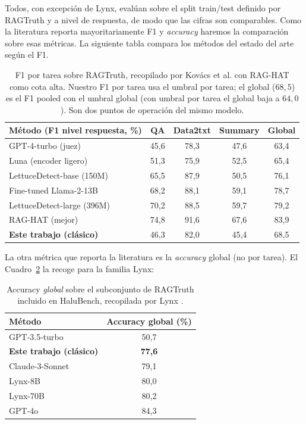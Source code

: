 \documentclass[12pt,a4paper]{report}
\theoremstyle{definition}
\begin{document}
Todos, con excepción de Lynx, evalúan sobre el split train/test definido por RAGTruth y a nivel de respuesta, de modo que las cifras
son comparables. Como la literatura
reporta mayoritariamente F1 y \emph{accuracy} haremos la comparación sobre esas métricas. La siguiente tabla compara los métodos del estado del arte según el F1.

\begin{table}[H]
\centering
\small
\begin{tabular}{lcccc}
\toprule
Método (F1 nivel respuesta, \%) & QA & Data2txt & Summary & Global \\
\midrule
GPT-4-turbo (juez) & 45,6 & 78,3 & 47,6 & 63,4 \\
Luna (encoder ligero) & 51,3 & 75,9 & 52,5 & 65,4 \\
LettuceDetect-base (150M) & 65,5 & 87,9 & 50,5 & 76,1 \\
Fine-tuned Llama-2-13B & 68,2 & 88,1 & 59,1 & 78,7 \\
LettuceDetect-large (396M) & 70,2 & 88,5 & 59,7 & 79,2 \\
RAG-HAT (mejor) & 74,8 & 91,6 & 67,6 & 83,9 \\
\midrule
\textbf{Este trabajo (clásico)} & 46,3 & 82,0 & 45,4 & 68,5 \\
\bottomrule
\end{tabular}
\caption{F1 por tarea sobre RAGTruth, recopilado por Kovács et al.
\cite{kovacs2025lettucedetect} con RAG-HAT \cite{song2024raghat} como cota alta. Nuestro F1
por tarea usa el umbral por tarea; el global ($68{,}5$) es el F1 pooled con el umbral global (con
umbral por tarea el global baja a $64{,}0$). Son dos puntos de operación del mismo modelo.}
\label{tab:lit}
\end{table}

La otra métrica que reporta la literatura es la \emph{accuracy} global (no por tarea). El
Cuadro~\ref{tab:acc} la recoge para la familia Lynx:

\begin{table}[H]
\centering
\small
\begin{tabular}{lc}
\toprule
Método & Accuracy global (\%) \\
\midrule
GPT-3.5-turbo & 50,7 \\
\textbf{Este trabajo (clásico)} & \textbf{77,6} \\
Claude-3-Sonnet & 79,1 \\
Lynx-8B & 80,0 \\
Lynx-70B & 80,2 \\
GPT-4o & 84,3 \\
\bottomrule
\end{tabular}
\caption{Accuracy \emph{global} sobre el subconjunto de RAGTruth incluido en HaluBench, recopilada
por Lynx \cite{ravi2024lynx}.}
\label{tab:acc}
\end{table}
\end{document}
